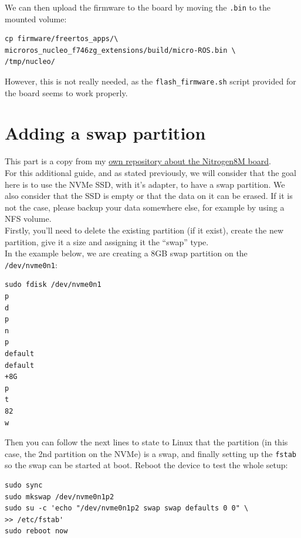 \documentclass[10pt]{article}
\begin{document}
We can then upload the firmware to the board by moving the \verb|.bin| to the mounted volume:
\begin{tcolorbox}
\begin{verbatim}
cp firmware/freertos_apps/\
microros_nucleo_f746zg_extensions/build/micro-ROS.bin \
/tmp/nucleo/
\end{verbatim}
\end{tcolorbox}

However, this is not really needed, as the \verb|flash_firmware.sh| script provided for the board seems to work properly.

\pagebreak
\section{Adding a swap partition}
\label{appendix:adding-swap-part}
This part is a copy from my \href{https://gitlab.com/nitrogen8m/documentation/}{own repository about the Nitrogen8M board}.\\

For this additional guide, and as stated previously, we will consider that the goal here is to use the NVMe SSD, with it's adapter, to have a swap partition. We also consider that the SSD is empty or that the data on it can be erased. If it is not the case, please backup your data somewhere else, for example by using a NFS volume.\\

Firstly, you'll need to delete the existing partition (if it exist), create the new partition, give it a size and assigning it the ``swap'' type.\\
In the example below, we are creating a 8GB swap partition on the \verb|/dev/nvme0n1|:
\begin{tcolorbox}
\begin{verbatim}
sudo fdisk /dev/nvme0n1
p
d
p
n
p
default
default
+8G
p
t
82
w
\end{verbatim}
\end{tcolorbox}

Then you can follow the next lines to state to Linux that the partition (in this case, the 2nd partition on the NVMe) is a swap, and finally setting up the \verb|fstab| so the swap can be started at boot. Reboot the device to test the whole setup:
\begin{tcolorbox}
\begin{verbatim}
sudo sync
sudo mkswap /dev/nvme0n1p2
sudo su -c 'echo "/dev/nvme0n1p2 swap swap defaults 0 0" \
>> /etc/fstab'
sudo reboot now
\end{verbatim}
\end{tcolorbox}
\end{document}
